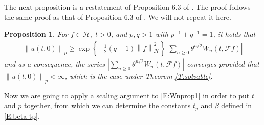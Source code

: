 \documentclass[a4paper,11pt]{article}
\numberwithin{equation}{section}
\numberwithin{equation}{section}
\theoremstyle{plain}
\newtheorem{proposition}[theorem]{Proposition}
\theoremstyle{definition}
\newcommand{\Norm}[1]{\left\|  #1   \right\|}
\begin{document}
The next proposition is a restatement of Proposition 6.3 of \cite{BCC21}. The proof follows the same
proof as that of Proposition 6.3 of \cite{BCC21}. We will not repeat it here.
\begin{proposition} \label{P:Wnprop1}
  For $f\in \mathcal{H}$, $t>0$, and $p,q>1$ with $p^{-1} + q^{-1}=1$, it holds that
  \begin{align} \label{E:Wnprop1}
    \Norm{u(t,0)}_p \ge \exp\left\{ -\frac{1}{2}(q-1)\Norm{f}_{\mathcal{H}}^2 \right\} \left| \sum_{n \ge 0} \theta^{n/2} W_n(t,\mathcal{F}f) \right|
  \end{align}
  and as a consequence, the series $\left| \sum_{n \ge 0} \theta^{n/2} W_n(t,\mathcal{F}f) \right|$
  converges provided that $\Norm{u(t,0)}_p < \infty$, which is the case under Theorem
  \ref{T:solvable}.
\end{proposition}

Now we are going to apply a scaling argument to \eqref{E:Wnprop1} in order to put $t$ and $p$
together, from which we can determine the constants $t_p$ and $\beta$ defined in \eqref{E:beta-tp}.
\end{document}

